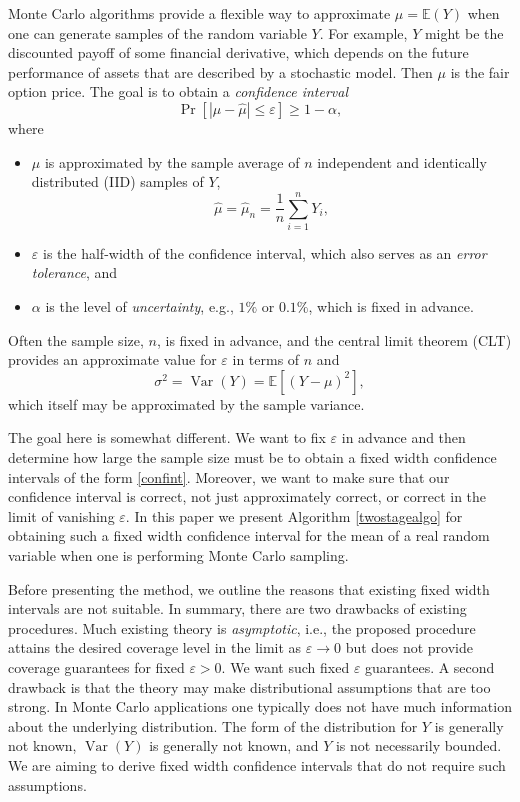 \documentclass[graybox]{svmult}
\newcommand\e{\mathbb{E}}
\newcommand{\Prob}{\Pr}
\newcommand{\abs}[1]{\left|#1\right|}
\DeclareMathOperator{\var}{Var}
\newcommand{\hmu}{\hat{\mu}}
\def\abs#1{\ensuremath{\left \lvert #1 \right \rvert}}
\begin{document}
Monte Carlo algorithms provide a flexible way to approximate $\mu = \e(Y)$ when one can generate samples of the random variable $Y$. For example, $Y$ might be the discounted payoff of some financial derivative, which depends on the future performance of assets that are described by a stochastic model.  Then $\mu$ is the fair option price.  The goal is to obtain a \emph{confidence interval} 
\begin{equation} \label{confint}
\Prob[\abs{\mu - \hmu} \le \varepsilon] \ge 1-\alpha,
\end{equation}
where 
\begin{itemize}

\item $\mu$ is approximated by the sample average of $n$ independent and identically distributed (IID) samples of $Y$,
\begin{equation} \label{eq:samplemean}
\hmu = \hmu_n=\frac 1n \sum_{i=1}^n Y_i,
\end{equation}

\item $\varepsilon$ is the half-width of the confidence interval, which also serves as an \emph{error tolerance}, and

\item $\alpha$ is the level of \emph{uncertainty}, e.g., $1\%$ or $0.1\%$, which is fixed in advance.

\end{itemize}
Often the sample size, $n$, is fixed in advance, and the central limit theorem (CLT) provides an approximate value for $\varepsilon$ in terms of $n$ and 
\begin{equation} \label{sigmadef}
\sigma^2=\var(Y)=\e[(Y-\mu)^2],
\end{equation}
which itself may be approximated by the sample variance.

The goal here is somewhat different.  We want to fix $\varepsilon$ in advance and then determine how large the sample size must be to obtain a fixed
width confidence intervals of the form \eqref{confint}. Moreover, we want to make sure that our confidence interval is correct, not just approximately correct, or correct in the limit of vanishing $\varepsilon$.  In this paper we present Algorithm \ref{twostagealgo} for obtaining such a fixed width confidence interval for the mean of a real random
variable when one is performing Monte Carlo sampling.

Before presenting the method, we outline the reasons
that existing fixed width intervals are not suitable.  In summary, there are two drawbacks of existing procedures.  Much existing theory is \emph{asymptotic}, i.e., the proposed procedure attains the desired coverage level in the limit as $\varepsilon\to 0$ but does not provide
coverage guarantees for fixed $\varepsilon>0$.  We want such fixed $\varepsilon$ guarantees.  A second drawback is that the theory may make distributional assumptions that are too strong.  In Monte Carlo applications one typically does not have much information about the underlying distribution.  The form of the distribution for $Y$ is generally not known, $\var(Y)$ is generally not known, and $Y$ is not necessarily bounded. We are aiming to derive fixed width confidence intervals that do not require such assumptions.  
\end{document}
